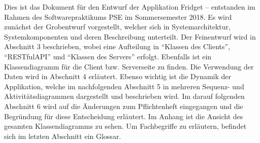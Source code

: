 Dies ist das Dokument für den Entwurf der Applikation Fridget – entstanden im Rahmen des Softwarepraktikums PSE im Sommersemester 2018.
Es wird zunächst der Grobentwurf vorgestellt, welcher sich in Systemarchitektur, Systemkomponenten und deren Beschreibung unterteilt. 
Der Feinentwurf wird in Abschnitt 3 beschrieben, wobei eine Aufteilung in ``Klassen des Clients'', ``RESTfulAPI'' und ``Klassen des Servers'' erfolgt. Ebenfalls ist ein Klassendiagramm für die Client bzw. Serverseite zu finden. Die Verwendung der Daten wird in Abschnitt 4 erläutert.
Ebenso wichtig ist die Dynamik der Applikation, welche im nachfolgenden Abschnitt 5 in mehreren Sequenz- und Aktivitätsdiagrammen dargestellt und beschrieben wird. 
Im darauf folgenden Abschnitt 6 wird auf die Änderungen zum Pflichtenheft eingegangen und die Begründung für diese Entscheidung erläutert.
Im Anhang ist die Ansicht des gesamten Klassendiagramms zu sehen.
Um Fachbegriffe zu erläutern, befindet sich im letzten Abschnitt ein Glossar.
